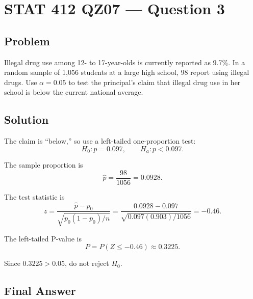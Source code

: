 \documentclass[11pt]{article}
\begin{document}
\section*{STAT 412 QZ07 --- Question 3}

\subsection*{Problem}

Illegal drug use among 12- to 17-year-olds is currently reported as 9.7\%. In a random sample of 1,056 students at a large high school, 98 report using illegal drugs. Use $\alpha=0.05$ to test the principal's claim that illegal drug use in her school is below the current national average.

\subsection*{Solution}

The claim is ``below,'' so use a left-tailed one-proportion test:
\[
H_0:p=0.097,\qquad H_a:p<0.097.
\]

The sample proportion is
\[
\widehat{p}=\frac{98}{1056}=0.0928.
\]

The test statistic is
\[
z=\frac{\widehat{p}-p_0}{\sqrt{p_0(1-p_0)/n}}
=\frac{0.0928-0.097}{\sqrt{0.097(0.903)/1056}}
=-0.46.
\]

The left-tailed P-value is
\[
P=P(Z\le -0.46)\approx 0.3225.
\]

Since $0.3225>0.05$, do not reject $H_0$.

\subsection*{Final Answer}

\end{document}
